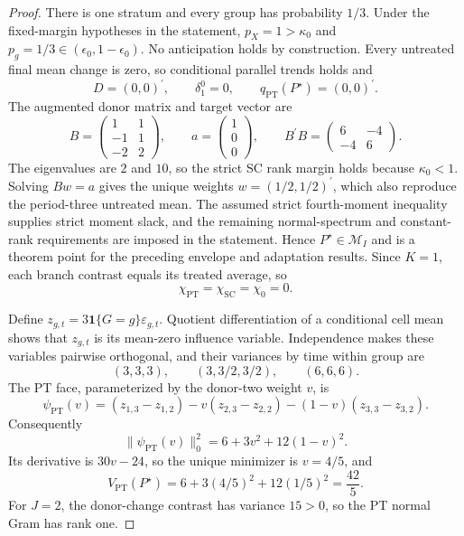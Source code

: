 \documentclass{article}
\begin{document}
\begin{proof}
There is one stratum and every group has probability \(1/3\).  Under the fixed-margin hypotheses in the statement, \(p_X=1>\kappa_0\) and \(p_g=1/3\in(\epsilon_0,1-\epsilon_0)\).  No anticipation holds by construction.  Every untreated final mean change is zero, so conditional parallel trends holds and
\[
 D=(0,0)^{\prime},
 \qquad
 \delta_1^0=0,
 \qquad
 q_{\mathrm{PT}}(P^{\star})=(0,0)^{\prime}.
 \tag{1}
\]
The augmented donor matrix and target vector are
\[
 B=\begin{pmatrix}1&1\\-1&1\\-2&2\end{pmatrix},
 \qquad
 a=\begin{pmatrix}1\\0\\0\end{pmatrix},
 \qquad
 B^{\prime}B=\begin{pmatrix}6&-4\\-4&6\end{pmatrix}.
 \tag{2}
\]
The eigenvalues are \(2\) and \(10\), so the strict SC rank margin holds because \(\kappa_0<1\).  Solving \(Bw=a\) gives the unique weights \(w=(1/2,1/2)^{\prime}\), which also reproduce the period-three untreated mean.  The assumed strict fourth-moment inequality supplies strict moment slack, and the remaining normal-spectrum and constant-rank requirements are imposed in the statement.  Hence \(P^{\star}\in\mathcal M_I\) and is a theorem point for the preceding envelope and adaptation results.  Since \(K=1\), each branch contrast equals its treated average, so
\[
 \chi_{\mathrm{PT}}=\chi_{\mathrm{SC}}=\chi_0=0.
 \tag{3}
\]

Define \(z_{g,t}=3\mathbf 1\{G=g\}\varepsilon_{g,t}\).  Quotient differentiation of a conditional cell mean shows that \(z_{g,t}\) is its mean-zero influence variable.  Independence makes these variables pairwise orthogonal, and their variances by time within group are
\[
 (3,3,3),
 \qquad
 (3,3/2,3/2),
 \qquad
 (6,6,6).
 \tag{4}
\]
The PT face, parameterized by the donor-two weight \(v\), is
\[
 \psi_{\mathrm{PT}}(v)=(z_{1,3}-z_{1,2})
 -v(z_{2,3}-z_{2,2})-(1-v)(z_{3,3}-z_{3,2}).
 \tag{5}
\]
Consequently
\[
 \|\psi_{\mathrm{PT}}(v)\|_0^2=6+3v^2+12(1-v)^2.
 \tag{6}
\]
Its derivative is \(30v-24\), so the unique minimizer is \(v=4/5\), and
\[
 V_{\mathrm{PT}}(P^{\star})
 =6+3(4/5)^2+12(1/5)^2=\frac{42}{5}.
 \tag{7}
\]
For \(J=2\), the donor-change contrast has variance \(15>0\), so the PT normal Gram has rank one.


\end{proof}
\end{document}
